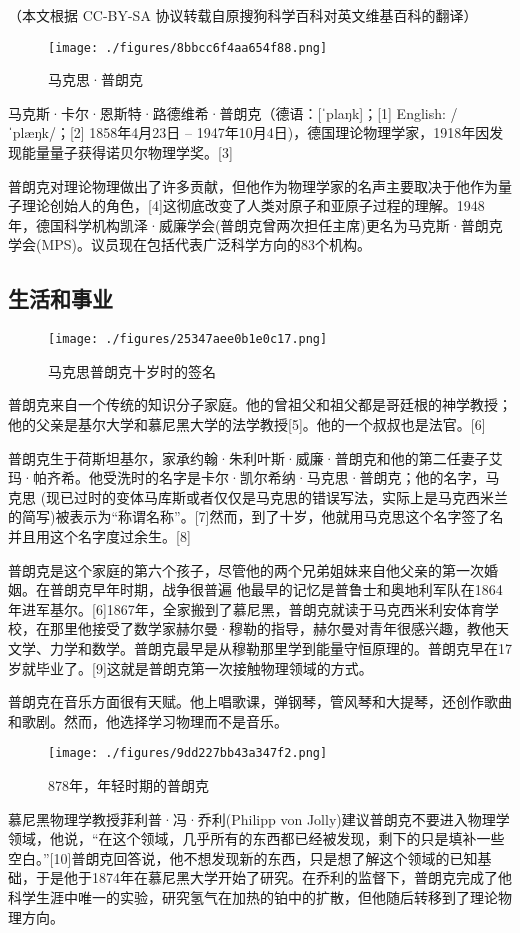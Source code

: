 
（本文根据 CC-BY-SA 协议转载自原搜狗科学百科对英文维基百科的翻译）
\begin{figure}[ht]
\centering
\texttt{[image: ./figures/8bbcc6f4aa654f88.png]}
\caption{马克思·普朗克} \label{fig_Max_7}
\end{figure}
马克斯·卡尔·恩斯特·路德维希·普朗克（德语：[ˈplaŋk]；[1] English: /ˈplæŋk/；[2] 1858年4月23日 – 1947年10月4日)，德国理论物理学家，1918年因发现能量量子获得诺贝尔物理学奖。[3]

普朗克对理论物理做出了许多贡献，但他作为物理学家的名声主要取决于他作为量子理论创始人的角色，[4]这彻底改变了人类对原子和亚原子过程的理解。1948年，德国科学机构凯泽·威廉学会(普朗克曾两次担任主席)更名为马克斯·普朗克学会(MPS)。议员现在包括代表广泛科学方向的83个机构。

\subsection{生活和事业}
\begin{figure}[ht]
\centering
\texttt{[image: ./figures/25347aee0b1e0c17.png]}
\caption{马克思普朗克十岁时的签名} \label{fig_Max_1}
\end{figure}
普朗克来自一个传统的知识分子家庭。他的曾祖父和祖父都是哥廷根的神学教授；他的父亲是基尔大学和慕尼黑大学的法学教授[5]。他的一个叔叔也是法官。[6]

普朗克生于荷斯坦基尔，家承约翰·朱利叶斯·威廉·普朗克和他的第二任妻子艾玛·帕齐希。他受洗时的名字是卡尔·凯尔希纳·马克思·普朗克；他的名字，马克思 (现已过时的变体马库斯或者仅仅是马克思的错误写法，实际上是马克西米兰的简写)被表示为“称谓名称”。[7]然而，到了十岁，他就用马克思这个名字签了名并且用这个名字度过余生。[8]

普朗克是这个家庭的第六个孩子，尽管他的两个兄弟姐妹来自他父亲的第一次婚姻。在普朗克早年时期，战争很普遍 他最早的记忆是普鲁士和奥地利军队在1864年进军基尔。[6]1867年，全家搬到了慕尼黑，普朗克就读于马克西米利安体育学校，在那里他接受了数学家赫尔曼·穆勒的指导，赫尔曼对青年很感兴趣，教他天文学、力学和数学。普朗克最早是从穆勒那里学到能量守恒原理的。普朗克早在17岁就毕业了。[9]这就是普朗克第一次接触物理领域的方式。

普朗克在音乐方面很有天赋。他上唱歌课，弹钢琴，管风琴和大提琴，还创作歌曲和歌剧。然而，他选择学习物理而不是音乐。
\begin{figure}[ht]
\centering
\texttt{[image: ./figures/9dd227bb43a347f2.png]}
\caption{878年，年轻时期的普朗克} \label{fig_Max_2}
\end{figure}
慕尼黑物理学教授菲利普·冯·乔利(Philipp von Jolly)建议普朗克不要进入物理学领域，他说，“在这个领域，几乎所有的东西都已经被发现，剩下的只是填补一些空白。”[10]普朗克回答说，他不想发现新的东西，只是想了解这个领域的已知基础，于是他于1874年在慕尼黑大学开始了研究。在乔利的监督下，普朗克完成了他科学生涯中唯一的实验，研究氢气在加热的铂中的扩散，但他随后转移到了理论物理方向。

